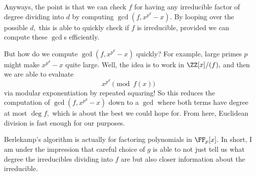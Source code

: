 \documentclass[../notes.tex]{subfiles}
\begin{document}
Anyways, the point is that we can check $f$ for having any irreducible factor of degree dividing into $d$ by computing $\gcd\left(f,x^{p^d}-x\right).$ By looping over the possible $d,$ this is able to quickly check if $f$ is irreducible, provided we can compute these $\gcd$s efficiently.

But how do we compute $\gcd\left(f,x^{p^d}-x\right)$ quickly? For example, large primes $p$ might make $x^{p^d}-x$ quite large. Well, the idea is to work in $\ZZ[x]/(f),$ and then we are able to evaluate
\[x^{p^d}\pmod{f(x)}\]
via modular exponentiation by repeated squaring! So this reduces the computation of $\gcd\left(f,x^{p^d}-x\right)$ down to a $\gcd$ where both terms have degree at most $\deg f,$ which is about the best we could hope for. From here, Euclidean division is fast enough for our purposes.
\begin{remark}[Nir]
	Berlekamp's algorithm is actually for factoring polynomials in $\FF_p[x].$ In short, I am under the impression that careful choice of $g$ is able to not just tell us what degree the irreducibles dividing into $f$ are but also closer information about the irreducible.
\end{remark}
\end{document}
